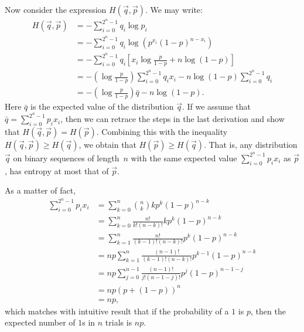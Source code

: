 Now consider the expression $H(\vec{q}, \vec{p})$. We may write:
\begin{align*}
    H(\vec{q}, \vec{p}) & = - \sum_{i = 0}^{2^n - 1} q_i \log p_i \\
        & = - \sum_{i = 0}^{2^n - 1} q_i \log \left ( p^{x_i} (1 - p)^{n - x_i} \right ) \\
        & = - \sum_{i = 0}^{2^n - 1} q_i \left [ x_i \log \frac{p}{1 - p} + n \log (1 - p) \right ] \\
        & = - \left ( \log \frac{p}{1 - p} \right ) \sum_{i = 0}^{2^n - 1} q_i x_i - n \log (1 - p) \sum_{i = 0}^{2^n - 1} q_i \\
        & = - \left ( \log \frac{p}{1 - p} \right ) \bar{q} - n \log (1 - p).
\end{align*}
Here $\bar{q}$ is the expected value of the distribution $\vec{q}$. If we assume that
$\bar{q} = \sum_{i = 0}^{2^n - 1} p_i x_i$, then we can retrace
the steps in the last derivation and show that $H(\vec{q}, \vec{p}) = H(\vec{p})$. Combining this with the
inequality $H(\vec{q}, \vec{p}) \geq H(\vec{q})$, we obtain that $H(\vec{p}) \geq H(\vec{q})$. That is, any
distribution $\vec{q}$ on binary sequences of length~$n$ with the same expected value $\sum_{i = 0}^{2^n - 1} p_i x_i$
as $\vec{p}$, has entropy at most that of $\vec{p}$.

As a matter of fact,
\begin{align*}
    \sum_{i = 0}^{2^n - 1} p_i x_i
        & = \sum_{k = 0}^{n} {n \choose k} k p^k (1 - p)^{n - k} \\
        & = \sum_{k = 0}^{n} \frac{n!}{k! (n - k)!} k p^k (1 - p)^{n - k} \\
        & = \sum_{k = 1}^{n} \frac{n!}{(k - 1)! (n - k)!} p^k (1 - p)^{n - k} \\
        & = np \sum_{k = 1}^{n} \frac{(n - 1)!}{(k - 1)! (n - k)!} p^{k - 1} (1 - p)^{n - k} \\
        & =  np \sum_{j = 0}^{n - 1} \frac{(n - 1)!}{j! (n - 1 - j)!} p^{j} (1 - p)^{n - 1 - j} \\
        & = np \left ( p + (1 - p) \right )^n \\
        & = np,
\end{align*}
which matches with intuitive result that if the probability of a $1$ is $p$, then the expected
number of $1$s in $n$ trials is $np$.
